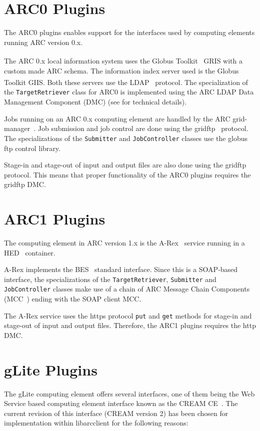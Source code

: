 \documentclass{book}
\newcommand{\GT}{Globus Toolkit\textsuperscript{\textregistered}}
\newcommand{\libarcclient}{libarcclient}
\newcommand{\JobController}{\texttt{JobController}}
\newcommand{\TargetRetriever}{\texttt{TargetRetriever}}
\newcommand{\Submitter}{\texttt{Submitter}}
\begin{document}
\section{ARC0 Plugins}

The ARC0 plugins enables support for the interfaces used by computing
elements running ARC version 0.x.

The ARC 0.x local information system uses the {\GT}~\cite{globus} GRIS
with a custom made ARC schema. The information index server used is the
{\GT} GIIS. Both these servers use the LDAP~\cite{ldap}
protocol. The specialization of the {\TargetRetriever} class for ARC0
is implemented using the ARC LDAP Data Management Component (DMC) (see
\cite{hed} for technical details).

Jobs running on an ARC 0.x computing element are handled by the ARC
grid-manager~\cite{gm}. Job submission and job control are done using
the gridftp~\cite{gridftp} protocol. The specializations of the
{\Submitter} and {\JobController} classes use the globus ftp control
library.

Stage-in and stage-out of input and output files are also done using
the gridftp~\cite{gridftp} protocol. This means that proper
functionality of the ARC0 plugins requires the gridftp DMC.

\section{ARC1 Plugins}

The computing element in ARC version 1.x is the A-Rex~\cite{arex}
service running in a HED~\cite{hed} container.

A-Rex implements the BES~\cite{ogsa-bes} standard interface. Since
this is a SOAP-based~\cite{soap} interface, the specializations of the
{\TargetRetriever}, {\Submitter} and {\JobController} classes make use
of a chain of ARC Message Chain Components (MCC~\cite{hed}) ending
with the SOAP client MCC.

The A-Rex service uses the https protocol \texttt{put} and \texttt{get} methods for
stage-in and stage-out of input and output files. Therefore, the ARC1
plugins requires the http DMC.

\section{gLite Plugins}

The gLite computing element offers several interfaces, one of them
being the Web Service based computing element interface known as the
CREAM CE~\cite{cream}. The current revision of this interface (CREAM
version 2) has been chosen for implementation within {\libarcclient} for the
following reasons:
\end{document}
